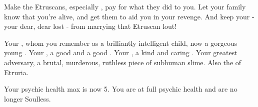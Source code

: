 \documentclass[blue]{Kos}
\begin{document}
Make the Etruscans, especially \cEtruriaKing{}, pay for what they did to you. Let your family know that you're alive, and get them to aid you in your revenge. And keep your \cBride{\sibling} - your dear, dear lost \cBride{\sibling} - from marrying that Etruscan lout!

\begin{contacts}
\contact{\cBride{}} Your \cBride{\sibling}, whom you remember as a brilliantly intelligent child, now a gorgeous young \cBride{\human}.
\contact{\cScythiaKing{}} Your \cScythiaKing{\parent}, a good \cScythiaKing{\human} and a good \cScythiaKing{\monarch}.
\contact{\cScythiaQueen{}} Your \cScythiaQueen{\parent}, a kind and caring \cScythiaQueen{\human}.
\contact{\cEtruriaKing{}} Your greatest adversary, a brutal, murderous, ruthless piece of subhuman slime. Also the \cEtruriaKing{\monarch} of Etruria.
\end{contacts} 

Your psychic health max is now 5. You are at full psychic health and are no longer Soulless.
\end{document}
